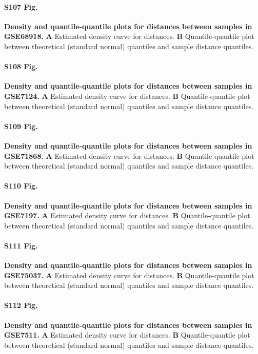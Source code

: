 \documentclass[10pt,letterpaper]{article}
\begin{document}
\paragraph*{S107 Fig.}
\hypertarget{S107_Fig}{
{\bf Density and quantile-quantile plots for distances between samples in GSE68918.} \textbf{A} Estimated density curve for distances. \textbf{B} Quantile-quantile plot between theoretical (standard normal) quantiles and sample distance quantiles.}

\paragraph*{S108 Fig.}
\hypertarget{S108_Fig}{
{\bf Density and quantile-quantile plots for distances between samples in GSE7124.} \textbf{A} Estimated density curve for distances. \textbf{B} Quantile-quantile plot between theoretical (standard normal) quantiles and sample distance quantiles.}

\paragraph*{S109 Fig.}
\hypertarget{S109_Fig}{
{\bf Density and quantile-quantile plots for distances between samples in GSE71868.} \textbf{A} Estimated density curve for distances. \textbf{B} Quantile-quantile plot between theoretical (standard normal) quantiles and sample distance quantiles.}

\paragraph*{S110 Fig.}
\hypertarget{S110_Fig}{
{\bf Density and quantile-quantile plots for distances between samples in GSE7197.} \textbf{A} Estimated density curve for distances. \textbf{B} Quantile-quantile plot between theoretical (standard normal) quantiles and sample distance quantiles.}

\paragraph*{S111 Fig.}
\hypertarget{S111_Fig}{
{\bf Density and quantile-quantile plots for distances between samples in GSE75037.} \textbf{A} Estimated density curve for distances. \textbf{B} Quantile-quantile plot between theoretical (standard normal) quantiles and sample distance quantiles.}

\paragraph*{S112 Fig.}
\hypertarget{S112_Fig}{
{\bf Density and quantile-quantile plots for distances between samples in GSE7511.} \textbf{A} Estimated density curve for distances. \textbf{B} Quantile-quantile plot between theoretical (standard normal) quantiles and sample distance quantiles.}
\end{document}
